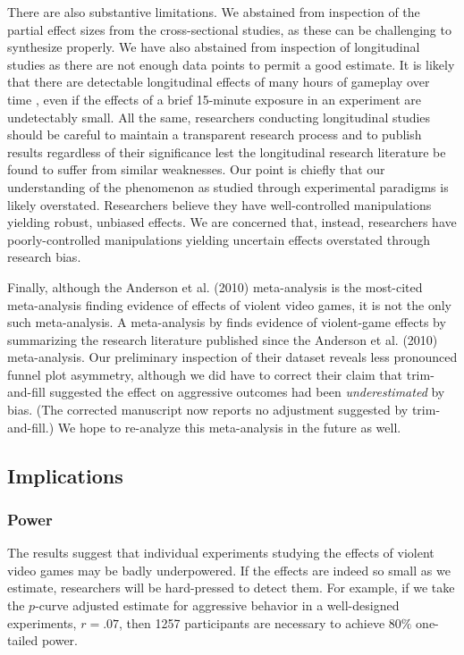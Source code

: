 \documentclass[man, mask]{apa6}
\begin{document}
There are also substantive limitations. We abstained from inspection of the partial effect sizes from the cross-sectional studies, as these can be challenging to synthesize properly. We have also abstained from inspection of longitudinal studies as there are not enough data points to permit a good estimate. It is likely that there are detectable longitudinal effects of many hours of gameplay over time \citep[e.g.,][]{Willoughby:etal:2012}, even if the effects of a brief 15-minute exposure in an experiment are undetectably small. All the same, researchers conducting longitudinal studies should be careful to maintain a transparent research process and to publish results regardless of their significance lest the longitudinal research literature be found to suffer from similar weaknesses. 
Our point is chiefly that our understanding of the phenomenon as studied through experimental paradigms is likely overstated. Researchers believe they have well-controlled manipulations yielding robust, unbiased effects. We are concerned that, instead, researchers have poorly-controlled manipulations yielding uncertain effects overstated through research bias.

Finally, although the Anderson et al. (2010) meta-analysis is the most-cited meta-analysis finding evidence of effects of violent video games, it is not the only such meta-analysis. A meta-analysis by \citet{Greitemeyer:Mugge:2014} finds evidence of violent-game effects by summarizing the research literature published since the Anderson et al. (2010) meta-analysis. Our preliminary inspection of their dataset reveals less pronounced funnel plot asymmetry, although we did have to correct their claim that trim-and-fill suggested the effect on aggressive outcomes had been {\em underestimated} by bias. (The corrected manuscript now reports no adjustment suggested by trim-and-fill.) We hope to re-analyze this meta-analysis in the future as well.

\subsection{Implications}

\subsubsection{Power}
The results suggest that individual experiments studying the effects of violent video games may be badly underpowered. If the effects are indeed so small as we estimate, researchers will be hard-pressed to detect them. For example, if we take the $p$-curve adjusted estimate for aggressive behavior in a well-designed experiments, $r = .07$, then 1257 participants are necessary to achieve $80\%$ one-tailed power. 
\end{document}
